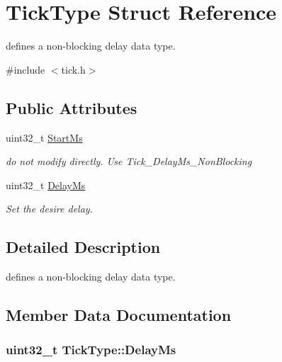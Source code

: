 \hypertarget{struct_tick_type}{\section{Tick\-Type Struct Reference}
\label{struct_tick_type}
}


defines a non-\/blocking delay data type.  




{\ttfamily \#include $<$tick.\-h$>$}

\subsection*{Public Attributes}
\begin{DoxyCompactItemize}
\item 
uint32\-\_\-t \hyperlink{struct_tick_type_ab5d0b8e09de5ccc9e44a9b261916bdd2}{Start\-Ms}
\begin{DoxyCompactList}\small\item\em do not modify directly. Use Tick\-\_\-\-Delay\-Ms\-\_\-\-Non\-Blocking \end{DoxyCompactList}\item 
uint32\-\_\-t \hyperlink{struct_tick_type_ae24ecd63a2b008c5c9a6864cbb3b30a7}{Delay\-Ms}
\begin{DoxyCompactList}\small\item\em Set the desire delay. \end{DoxyCompactList}\end{DoxyCompactItemize}


\subsection{Detailed Description}
defines a non-\/blocking delay data type. 

\subsection{Member Data Documentation}
\hypertarget{struct_tick_type_ae24ecd63a2b008c5c9a6864cbb3b30a7}{
\subsubsection[{Delay\-Ms}]{\setlength{\rightskip}{0pt plus 5cm}uint32\-\_\-t Tick\-Type\-::\-Delay\-Ms}}\label{struct_tick_type_ae24ecd63a2b008c5c9a6864cbb3b30a7}


